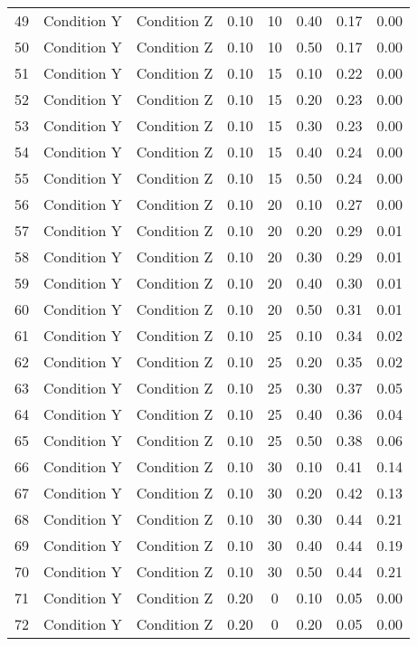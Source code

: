 \begin{landscape}
\begin{longtable}{cc cc cc cc}
  49 & Condition Y & Condition Z & 0.10 &  10 & 0.40 & 0.17 & 0.00 \\ 
  50 & Condition Y & Condition Z & 0.10 &  10 & 0.50 & 0.17 & 0.00 \\ 
  51 & Condition Y & Condition Z & 0.10 &  15 & 0.10 & 0.22 & 0.00 \\ 
  52 & Condition Y & Condition Z & 0.10 &  15 & 0.20 & 0.23 & 0.00 \\ 
  53 & Condition Y & Condition Z & 0.10 &  15 & 0.30 & 0.23 & 0.00 \\ 
  54 & Condition Y & Condition Z & 0.10 &  15 & 0.40 & 0.24 & 0.00 \\ 
  55 & Condition Y & Condition Z & 0.10 &  15 & 0.50 & 0.24 & 0.00 \\ 
  56 & Condition Y & Condition Z & 0.10 &  20 & 0.10 & 0.27 & 0.00 \\ 
  57 & Condition Y & Condition Z & 0.10 &  20 & 0.20 & 0.29 & 0.01 \\ 
  58 & Condition Y & Condition Z & 0.10 &  20 & 0.30 & 0.29 & 0.01 \\ 
  59 & Condition Y & Condition Z & 0.10 &  20 & 0.40 & 0.30 & 0.01 \\ 
  60 & Condition Y & Condition Z & 0.10 &  20 & 0.50 & 0.31 & 0.01 \\ 
  61 & Condition Y & Condition Z & 0.10 &  25 & 0.10 & 0.34 & 0.02 \\ 
  62 & Condition Y & Condition Z & 0.10 &  25 & 0.20 & 0.35 & 0.02 \\ 
  63 & Condition Y & Condition Z & 0.10 &  25 & 0.30 & 0.37 & 0.05 \\ 
  64 & Condition Y & Condition Z & 0.10 &  25 & 0.40 & 0.36 & 0.04 \\ 
  65 & Condition Y & Condition Z & 0.10 &  25 & 0.50 & 0.38 & 0.06 \\ 
  66 & Condition Y & Condition Z & 0.10 &  30 & 0.10 & 0.41 & 0.14 \\ 
  67 & Condition Y & Condition Z & 0.10 &  30 & 0.20 & 0.42 & 0.13 \\ 
  68 & Condition Y & Condition Z & 0.10 &  30 & 0.30 & 0.44 & 0.21 \\ 
  69 & Condition Y & Condition Z & 0.10 &  30 & 0.40 & 0.44 & 0.19 \\ 
  70 & Condition Y & Condition Z & 0.10 &  30 & 0.50 & 0.44 & 0.21 \\ 
  71 & Condition Y & Condition Z & 0.20 &   0 & 0.10 & 0.05 & 0.00 \\ 
  72 & Condition Y & Condition Z & 0.20 &   0 & 0.20 & 0.05 & 0.00 \\ 

\end{longtable}
\end{landscape}
